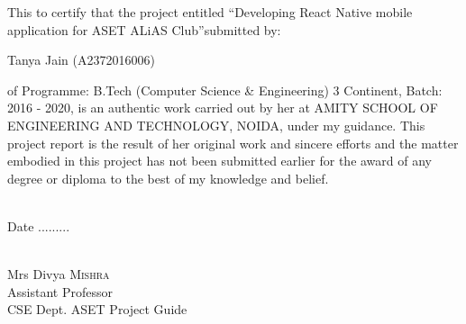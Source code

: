 \begin{certificate}
This to certify that the project entitled \textquotedblleft Developing React Native mobile application for ASET ALiAS Club\textquotedblright submitted by:
\begin{center} Tanya Jain     (A2372016006) \end{center}
of Programme: B.Tech (Computer Science \& Engineering) 3 Continent, Batch: 2016 - 2020, is an authentic work carried out by her at AMITY SCHOOL OF ENGINEERING AND TECHNOLOGY, NOIDA, under my guidance.
This project report is the result of her original work and sincere efforts and the matter embodied in this project has not been submitted earlier for the award of any degree or diploma to the best of my knowledge and belief.

\begin{flushleft}
  \textsc{}\\[1.0cm]
  Date .........
\end{flushleft}

\begin{flushright}
  \textsc{}\\[1.0cm]
  Mrs Divya \textsc{Mishra}\\ 
    Assistant Professor\\ CSE Dept. ASET
  Project Guide
\end{flushright}

\end{certificate}